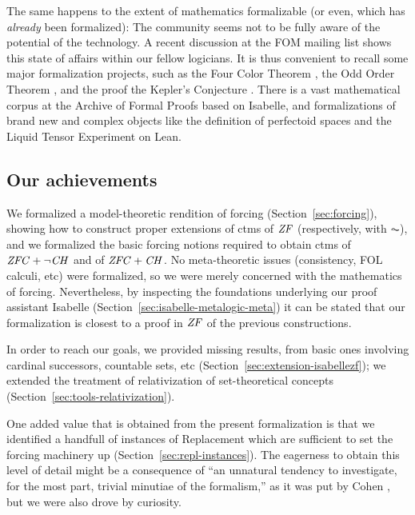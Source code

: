 The same happens to the extent of mathematics formalizable (or even,
which has \emph{already} been formalized): The community seems not to
be fully aware of the potential of the technology. A recent discussion
at the FOM mailing list shows this state of affairs within our fellow
logicians. It is thus convenient to recall
some major formalization projects, such as the Four Color Theorem
\cite{MR2463991}, the Odd Order Theorem
\cite{10.1007/978-3-642-39634-2_14}, and the proof the Kepler's
Conjecture \cite{MR3659768}. There is a vast mathematical corpus at
the Archive of Formal Proofs based on Isabelle, and formalizations of
brand new and complex objects like the definition of perfectoid spaces \cite{10.1145/3372885.3373830}
and the Liquid Tensor Experiment \cite{LTE2020,LTE2021} on Lean.

\subsection{Our achievements}
We formalized a model-theoretic rendition of forcing (Section~\ref{sec:forcing}), showing how to
construct proper extensions of ctms of $\mathit{ZF}$ (respectively, with
$\AC$), and we formalized the basic forcing notions required to obtain
ctms of $\mathit{ZFC} + \neg\mathit{CH}$ and of $\mathit{ZFC} + \mathit{CH}$. No meta-theoretic issues
(consistency, FOL calculi, etc) were formalized, so we were merely
concerned with the mathematics of forcing. Nevertheless, by inspecting
the foundations underlying our proof assistant Isabelle
(Section~\ref{sec:isabelle-metalogic-meta}) it can be stated that our
formalization is closest to a proof in $\mathit{ZF}$ of the previous
constructions.

In order to reach our goals, we provided missing results, from basic ones
involving cardinal successors, countable sets, etc
(Section~\ref{sec:extension-isabellezf}); we extended the treatment of relativization of
set-theoretical concepts (Section~\ref{sec:tools-relativization}).

One added value that is obtained from the present formalization is
that we identified a handfull of instances of Replacement which are
sufficient to set the forcing machinery up (Section~\ref{sec:repl-instances}).
The eagerness to obtain this level of detail might be a consequence of
“an unnatural tendency to investigate, for the most part, trivial
minutiae of the formalism,” as it was put by Cohen
\cite{zbMATH02012060}, but we were also drove by curiosity.

